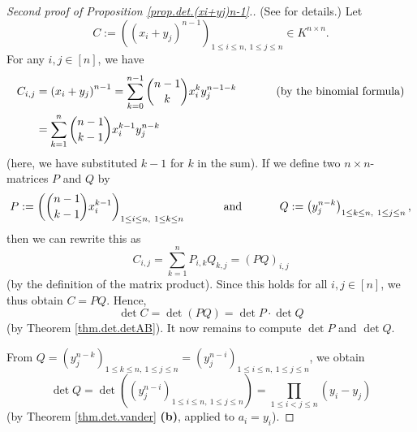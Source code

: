 \begin{proof}
[Second proof of Proposition \ref{prop.det.(xi+yj)n-1}.](See \cite[Exercise
6.17 \textbf{(b)}]{detnotes} for details.) Let
\[
C:=\left(  \left(  x_{i}+y_{j}\right)  ^{n-1}\right)  _{1\leq i\leq n,\ 1\leq
j\leq n}\in K^{n\times n}.
\]
For any $i,j\in\left[  n\right]  $, we have%
\begin{align*}
C_{i,j}  &  =\left(  x_{i}+y_{j}\right)  ^{n-1}=\sum_{k=0}^{n-1}\dbinom
{n-1}{k}x_{i}^{k}y_{j}^{n-1-k}\ \ \ \ \ \ \ \ \ \ \left(  \text{by the
binomial formula}\right) \\
&  =\sum_{k=1}^{n}\dbinom{n-1}{k-1}x_{i}^{k-1}y_{j}^{n-k}%
\end{align*}
(here, we have substituted $k-1$ for $k$ in the sum). If we define two
$n\times n$-matrices $P$ and $Q$ by
\[
P:=\left(  \dbinom{n-1}{k-1}x_{i}^{k-1}\right)  _{1\leq i\leq n,\ 1\leq k\leq
n}\ \ \ \ \ \ \ \ \ \ \text{and}\ \ \ \ \ \ \ \ \ \ Q:=\left(  y_{j}%
^{n-k}\right)  _{1\leq k\leq n,\ 1\leq j\leq n},
\]
then we can rewrite this as%
\[
C_{i,j}=\sum_{k=1}^{n}P_{i,k}Q_{k,j}=\left(  PQ\right)  _{i,j}%
\]
(by the definition of the matrix product). Since this holds for all
$i,j\in\left[  n\right]  $, we thus obtain $C=PQ$. Hence,
\begin{equation}
\det C=\det\left(  PQ\right)  =\det P\cdot\det Q
\label{pf.prop.det.(xi+yj)n-1.2nd.detA=1}%
\end{equation}
(by Theorem \ref{thm.det.detAB}). It now remains to compute $\det P$ and $\det
Q$.

From $Q=\left(  y_{j}^{n-k}\right)  _{1\leq k\leq n,\ 1\leq j\leq n}=\left(
y_{j}^{n-i}\right)  _{1\leq i\leq n,\ 1\leq j\leq n}$, we obtain%
\begin{equation}
\det Q=\det\left(  \left(  y_{j}^{n-i}\right)  _{1\leq i\leq n,\ 1\leq j\leq
n}\right)  =\prod_{1\leq i<j\leq n}\left(  y_{i}-y_{j}\right)
\label{pf.prop.det.(xi+yj)n-1.2nd.detQ=}%
\end{equation}
(by Theorem \ref{thm.det.vander} \textbf{(b)}, applied to $a_{i}=y_{i}$).


\end{proof}
